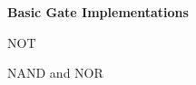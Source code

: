 \documentclass[twocolumn,english]{article}
\begin{document}
\begin{figure}[H]
\textbf{Basic Gate Implementations}

\noindent \begin{centering}
NOT
\par\end{centering}

\noindent \begin{centering}
\par\end{centering}

\noindent \begin{centering}
NAND and NOR
\par\end{centering}

\noindent \centering{}
\end{figure}
\end{document}
